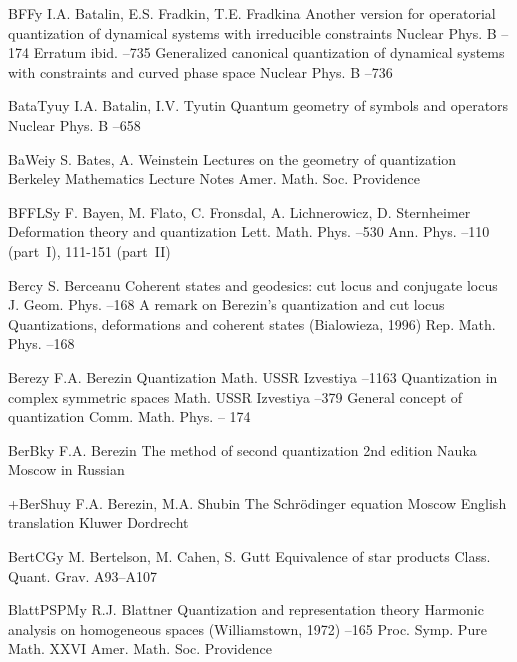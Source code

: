 \documentclass[11pt]{amsart}
\numberwithin{equation}{section}
\theoremstyle{remark}
\newcommand{\by}{\mathbf y}
\begin{document}
\begin{thebibliography}{199}
 BFF\by{ I.A. Batalin, E.S. Fradkin, T.E. Fradkina \paper Another version
for operatorial quantization of dynamical systems with irreducible constraints
\jour Nuclear Phys. B   --174 \moreref Erratum \jour
ibid.   --735 \moreref \paper Generalized canonical
quantization of dynamical systems with constraints and curved phase space \jour
Nuclear Phys. B   --736}

 BataTyu\by{ I.A. Batalin, I.V. Tyutin \paper Quantum geometry of symbols
and operators \jour Nuclear Phys. B   --658}

 BaWei\by{ S. Bates, A. Weinstein \book Lectures on the geometry of
quantization \bookinfo Berkeley Mathematics Lecture Notes  \publ Amer.
Math. Soc. \publaddr Providence }

 BFFLS\by{ F. Bayen, M. Flato, C. Fronsdal, A. Lichnerowicz, D.
Sternheimer \paper Deformation theory and quantization \jour Lett. Math.
Phys.   --530 \moreref \jour Ann. Phys. 
 --110 (part~I), 111-151 (part~II)}

 Berc\by{ S. Berceanu \paper Coherent states and geodesics: cut locus and
conjugate locus \jour J. Geom. Phys.   --168 \moreref
\paper A remark on Berezin's quantization and cut locus \inbook Quantizations,
deformations and coherent states (Bialowieza, 1996) \jour Rep. Math. Phys.
  --168}

 Berez\by{ F.A. Berezin \paper Quantization \jour Math. USSR Izvestiya
  --1163 \moreref \paper Quantization in complex
symmetric spaces \jour Math. USSR Izvestiya   --379
\moreref \paper General concept of quantization \jour Comm. Math. Phys.    -- 174}

 BerBk\by{ F.A. Berezin \book The method of second quantization \bookinfo
2nd edition \publ Nauka \publaddr Moscow  \lang in Russian}

 +BerShu\by{ F.A. Berezin, M.A. Shubin \book The Schr\"odinger equation
\publaddr Moscow  \transl English translation \publ Kluwer \publaddr
Dordrecht }

 BertCG\by{ M. Bertelson, M. Cahen, S. Gutt \paper Equivalence of star
products \jour Class. Quant. Grav.   \pages A93--A107}

 BlattPSPM\by{ R.J. Blattner \paper Quantization and representation theory
\inbook Harmonic analysis on homogeneous spaces (Will\-iams\-town, 1972) --165 \bookinfo Proc. Symp. Pure Math. \vol XXVI \publ Amer. Math. Soc.
\publaddr Providence }


\end{thebibliography}
\end{document}
